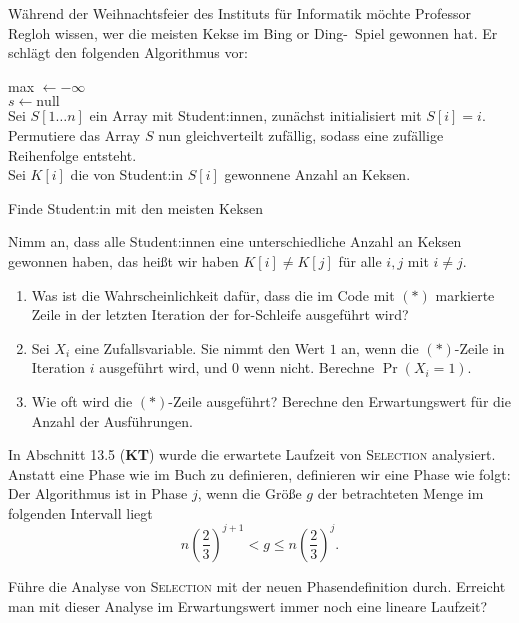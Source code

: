 \documentclass{uebung_cs}
\begin{document}
\begin{exercise}[Weihnachtsfeier][\href{https://moodle.studiumdigitale.uni-frankfurt.de/moodle/mod/assign/view.php?id=239339}{moodle}\athome]
	Während der Weihnachtsfeier des Instituts für Informatik möchte Professor Regloh wissen, wer die meisten Kekse im \glqq Bing or Ding\grqq{}-~Spiel gewonnen hat. Er schlägt den folgenden Algorithmus vor: 

	\begin{algorithm}[H]
		max $\gets -\infty$\\
		$s \gets \text{null}$\\
		Sei $S[1\dots n]$ ein Array mit Student:innen, zunächst initialisiert mit $S[i]=i$.\\
		Permutiere das Array $S$ nun gleichverteilt zufällig, sodass eine zufällige Reihenfolge entsteht.\\
		Sei $K[i]$ die von Student:in $S[i]$ gewonnene Anzahl an Keksen.\\
		\caption{Finde Student:in mit den meisten Keksen}
\end{algorithm}
	
	Nimm an, dass alle Student:innen eine unterschiedliche Anzahl an Keksen gewonnen haben, das heißt wir haben $K[i] \neq K[j]$ für alle $i,j$ mit $i \neq j$.
	\begin{enumerate}
		\item\easy Was ist die Wahrscheinlichkeit dafür, dass die im Code mit $(\ast)$ markierte Zeile in der letzten Iteration der for-Schleife ausgeführt wird?
		\item\medium Sei $X_i$ eine Zufallsvariable. Sie nimmt den Wert $1$ an, wenn die $(\ast)$-Zeile in Iteration $i$ ausgeführt wird, und $0$ wenn nicht. Berechne $\Pr(X_i = 1)$. 
		\item\hard Wie oft wird die $(\ast)$-Zeile ausgeführt? Berechne den Erwartungswert für die Anzahl der Ausführungen. 
	\end{enumerate}
\end{exercise}

\begin{exercise}
	In Abschnitt 13.5 (\textbf{KT}) wurde die erwartete Laufzeit von \textsc{Selection} analysiert.
	Anstatt eine Phase wie im Buch zu definieren, definieren wir eine Phase wie folgt:
	Der Algorithmus ist in Phase $j$, wenn die Größe $g$ der betrachteten Menge im folgenden Intervall liegt
	\[n\left(\frac{2}{3}\right)^{j+1} < g \leq n\left(\frac{2}{3}\right)^j. \]
	
	Führe die Analyse von \textsc{Selection} mit der neuen Phasendefinition durch. Erreicht man mit dieser Analyse im Erwartungswert immer noch eine lineare Laufzeit?
\end{exercise}    
\end{document}
